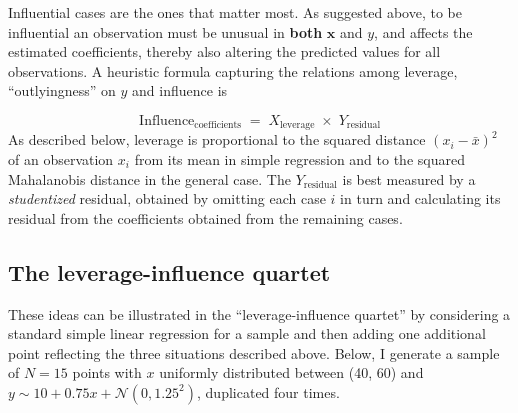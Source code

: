 \documentclass[
  letterpaper,
  10pt,
  krantz2]{krantz}
\begin{document}
Influential cases are the ones that matter most. As suggested above, to
be influential an observation must be unusual in \textbf{both}
\(\mathbf{x}\) and \(y\), and affects the estimated coefficients,
thereby also altering the predicted values for all observations. A
heuristic formula capturing the relations among leverage,
``outlyingness'' on \(y\) and influence is

\[
\text{Influence}_{\text{coefficients}} \;=\; X_\text{leverage} \;\times\; Y_\text{residual}
\] As described below, leverage is proportional to the squared distance
\((x_i - \bar{x})^2\) of an observation \(x_i\) from its mean in simple
regression and to the squared Mahalanobis distance in the general case.
The \(Y_\text{residual}\) is best measured by a \emph{studentized}
residual, obtained by omitting each case \(i\) in turn and calculating
its residual from the coefficients obtained from the remaining cases.

\subsection{The leverage-influence quartet}\label{sec-lev-inf-quartet}

These ideas can be illustrated in the ``leverage-influence quartet'' by
considering a standard simple linear regression for a sample and then
adding one additional point reflecting the three situations described
above. Below, I generate a sample of \(N = 15\) points with \(x\)
uniformly distributed between (40, 60) and
\(y \sim 10 + 0.75 x + \mathcal{N}(0, 1.25^2)\), duplicated four times.
\end{document}
